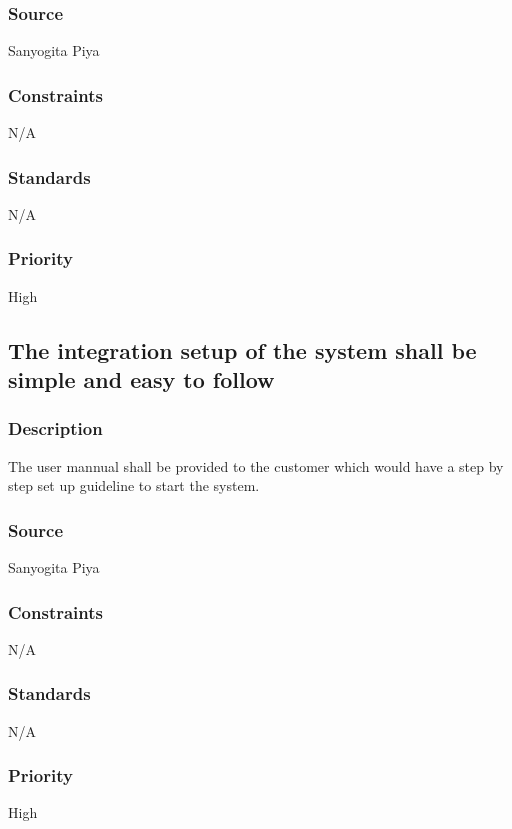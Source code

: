 \subsubsection{Source}
Sanyogita Piya
\subsubsection{Constraints}
N/A
\subsubsection{Standards}
N/A
\subsubsection{Priority}
High


\subsection{The integration setup of the system shall be simple and easy to follow}
\subsubsection{Description}
The user mannual shall be provided to the customer which would have a step by step set up guideline to start the system.
\subsubsection{Source}
Sanyogita Piya
\subsubsection{Constraints}
N/A
\subsubsection{Standards}
N/A
\subsubsection{Priority}
High
